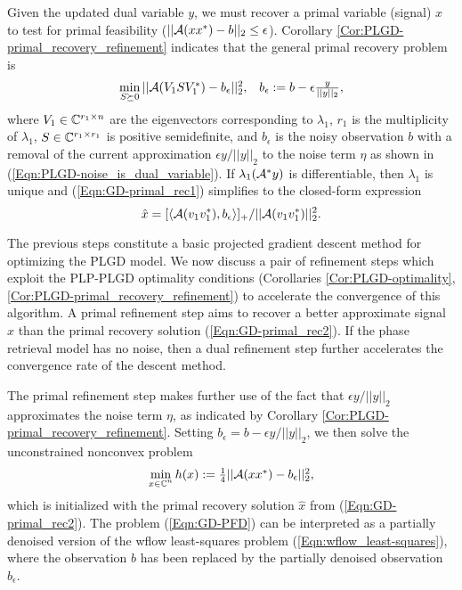Given the updated dual variable $y$, we must recover a primal variable (signal) $x$ to test for primal feasibility ($|| {\mathcal A} (xx^*) - b ||_2 \leq \epsilon$).  Corollary \ref{Cor:PLGD-primal_recovery_refinement} indicates that the general primal recovery problem is
\begin{equation} 	\label{Eqn:GD-primal_rec1}
\begin{array}{lr}
\min\limits_{\substack{S \succeq 0}}	|| {\mathcal A}(V_1 S V_1^*) - b_\epsilon ||_2^2,
	& 	b_\epsilon := b - \epsilon \frac{y}{||y||_2},
\end{array}
\end{equation}
where $V_1 \in {\mathbb C}^{r_1 \times n}$ are the eigenvectors corresponding to $\lambda_1$, $r_1$ is the multiplicity of $\lambda_1$, $S \in {\mathbb C}^{r_1 \times r_1}$ is positive semidefinite, and $b_\epsilon$ is the noisy observation $b$ with a removal of the current approximation $\epsilon y / ||y||_2$ to the noise term $\eta$ as shown in (\ref{Eqn:PLGD-noise_is_dual_variable}).  If $ \lambda_1({\mathcal A}^* y)$ is differentiable, then $\lambda_1$ is unique and (\ref{Eqn:GD-primal_rec1}) simplifies to the closed-form expression
\begin{equation} 	\label{Eqn:GD-primal_rec2}
\hat{x} = [ \langle {\mathcal A}(v_1v_1^*), b_\epsilon \rangle ]_+ / || {\mathcal A}(v_1v_1^*)||_2^2.
\end{equation}






The previous steps constitute a basic projected gradient descent method for optimizing the PLGD model.  
We now discuss a pair of refinement steps which exploit the PLP-PLGD optimality conditions (Corollaries \ref{Cor:PLGD-optimality}, \ref{Cor:PLGD-primal_recovery_refinement}) to accelerate the convergence of this algorithm.  
A primal refinement step aims to recover a better approximate signal $x$ than the primal recovery solution (\ref{Eqn:GD-primal_rec2}).  
If the phase retrieval model has no noise, then a dual refinement step further accelerates the convergence rate of the descent method.  





The primal refinement step makes further use of the fact that $\epsilon y / ||y||_2$ approximates the noise term $\eta$, as indicated by Corollary \ref{Cor:PLGD-primal_recovery_refinement}.  Setting $b_\epsilon = b - \epsilon y / ||y||_2$, we then solve the unconstrained nonconvex problem
\begin{equation}	\label{Eqn:GD-PFD}
\begin{array}{l}
\min\limits_{\substack{x \in {\mathbb C}^n}} h(x) := \frac{1}{4}|| {\mathcal A}(x x^*) - b_\epsilon
||_2^2,
\end{array}
\end{equation}
which is initialized with the primal recovery solution $\hat{x}$ from (\ref{Eqn:GD-primal_rec2}).  The problem (\ref{Eqn:GD-PFD}) can be interpreted as a partially denoised version of the wflow least-squares problem (\ref{Eqn:wflow_least-squares}), where the observation $b$ has been replaced by the partially denoised observation $b_\epsilon$.




